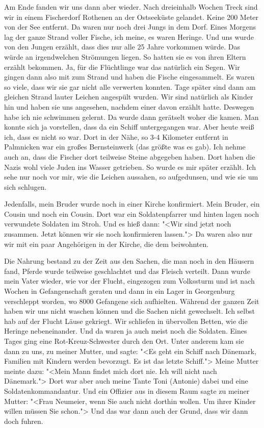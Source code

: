 \documentclass[12pt, twoside]{book}
\begin{document}
Am Ende fanden wir uns dann aber wieder.
Nach dreieinhalb Wochen Treck sind wir in einem Fischerdorf Rothenen an der Ostseeküste gelandet. Keine 200 Meter von der See entfernt. Da waren nur noch drei Jungs in dem Dorf. Eines Morgens lag der ganze Strand
voller Fische, ich meine, es waren Heringe. Und uns wurde von den Jungen erzählt, dass dies nur alle 25 Jahre vorkommen würde. Das würde an irgendwelchen Strömungen liegen. So hatten sie es von ihren Eltern erzählt bekommen.
Ja, für die Flüchtlinge war das natürlich ein Segen. Wir gingen dann also mit zum Strand und haben die Fische eingesammelt. Es waren so viele, dass wir sie gar nicht alle verwerten konnten.
Tage später sind dann am gleichen Strand lauter Leichen angespült wurden. Wir sind natürlich als Kinder hin und haben sie uns angesehen, nachdem einer davon erzählt hatte. Deswegen habe ich nie schwimmen gelernt.
Da wurde dann gerätselt woher die kamen. Man konnte sich ja vorstellen, dass da ein Schiff untergegangen war. Aber heute weiß ich, dass es nicht so war. Dort in der Nähe, so 3-4 Kilometer entfernt in
Palmnicken war ein großes Bernsteinwerk (das größte was es gab). Ich nehme auch an, dass die Fischer dort teilweise Steine abgegeben haben. Dort haben die Nazis wohl viele Juden ins Wasser getrieben. So wurde es mir später erzählt.
Ich sehe nur noch vor mir, wie die Leichen aussahen, so aufgedunsen, und wie sie um sich schlugen.

Jedenfalls, mein Bruder wurde noch in einer Kirche konfirmiert. Mein Bruder, ein Cousin und noch ein Cousin. Dort war ein Soldatenpfarrer und hinten lagen noch verwundete Soldaten im Stroh.
Und es hieß dann: "<Wir sind jetzt noch zusammen. Jetzt können wir sie noch konfirmieren lassen."> Da waren also nur wir mit ein paar Angehörigen in der Kirche, die dem beiwohnten.

Die Nahrung bestand zu der Zeit aus den Sachen, die man noch in den Häusern fand, Pferde wurde teilweise geschlachtet und das Fleisch verteilt. Dann wurde mein Vater wieder, wie vor der Flucht, eingezogen
zum Volkssturm und ist nach Wochen in Gefangenschaft geraten und dann in ein Lager in Georgenburg verschleppt worden, wo 8000 Gefangene sich aufhielten.
Während der ganzen Zeit haben wir uns nicht waschen können und die Sachen nicht gewechselt.
Ich selbst hab auf der Flucht Läuse gekriegt. Wir schliefen in übervollen Betten, wie die Heringe nebeneinander. Und da waren ja auch meist noch die Soldaten. 
Eines Tages ging eine Rot-Kreuz-Schwester durch den Ort. Unter anderem kam sie dann zu uns, zu meiner Mutter, und sagte: "<Es geht ein Schiff nach Dänemark, Familien mit Kindern werden bevorzugt. Es ist das letzte Schiff.">
Meine Mutter meinte dazu: "<Mein Mann findet mich dort nie. Ich will nicht nach Dänemark."> Dort war aber auch meine Tante Toni (Antonie) dabei und eine Soldatenkommandantur. Und ein Offizier aus in diesem Raum 
sagte zu meiner Mutter: "<Frau Neumeier, wenn Sie auch nicht dorthin wollen. Um ihrer Kinder willen müssen Sie schon."> Und das war dann auch der Grund, dass wir dann doch fuhren. 
\end{document}
